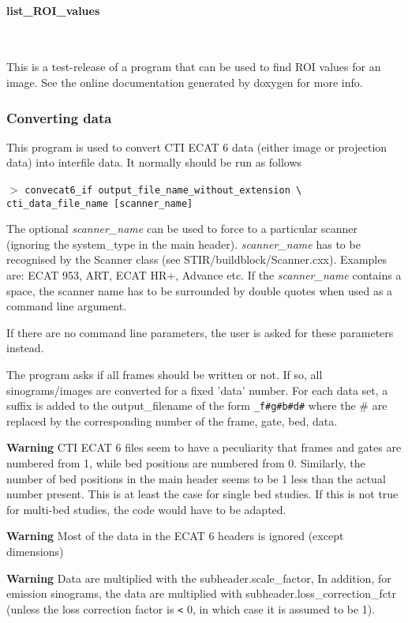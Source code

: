 \documentclass{article}
\newcommand{\subsubsubsection}[1]{\paragraph{#1}\mbox{} \\}
\newcommand{\cmdline}[1]{\par \noindent $>$ \texttt{#1}\par}
\begin{document}
{{ \subsubsubsection{list\_ROI\_values}
}

This is a test-release of a program that can be used to find 
ROI values for an image. See the online documentation generated 
by doxygen for more info.


\subsubsection{
Converting data}
\label{sec:convertingdata}
This program is used to convert CTI ECAT 6 data (either image 
or projection data) into interfile data. It normally should be 
run as follows
\cmdline{convecat6\_if output\_file\_name\_without\_extension {\textbackslash}\\
cti\_data\_file\_name [scanner\_name]}


The optional \textit{scanner\_name} can be used to force to a particular 
scanner (ignoring the system\_type in the main header). \textit{scanner\_name} 
has to be recognised by the Scanner class (see STIR/buildblock/Scanner.cxx). 
Examples are: ECAT 953, ART, ECAT HR+, Advance etc. If the \textit{scanner\_name} 
contains a space, the scanner name has to be surrounded by double 
quotes  when used as a command line argument.


If there are no command line parameters, the user is asked for 
these parameters instead. 


The program asks if all frames should be written or not. If so, 
all sinograms/images are converted for a fixed 'data' number. 
For each data set, a suffix is added to the output\_filename 
of the form \texttt{\_f\#g\#b\#d\#} where the \# are replaced 
by the corresponding number of the frame, gate, bed, data.



\textbf{Warning} CTI ECAT 6 files seem to have a peculiarity that 
frames and gates are numbered from 1, while bed positions are 
numbered from 0. Similarly, the number of bed positions in the 
main header seems to be 1 less than the actual number present. 
This is at least the case for single bed studies. If this is 
not true for multi-bed studies, the code would have to be adapted.


\textbf{Warning} Most of the data in the ECAT 6 headers is ignored 
(except dimensions)


\textbf{Warning} Data are multiplied with the subheader.scale\_factor, 
In addition, for emission sinograms, the data are multiplied 
with subheader.loss\_correction\_fctr (unless the loss correction 
factor is \texttt{<} 0, in which case it is assumed to be 1).


}
\end{document}
